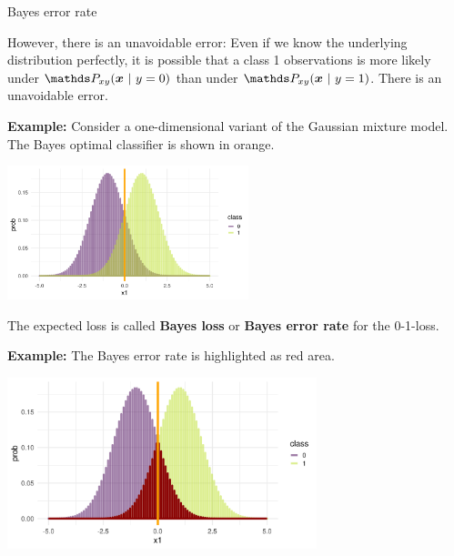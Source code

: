 \begin{vbframe}{Bayes error rate}

However, there is an unavoidable error: Even if we know the underlying distribution perfectly, it is possible that a class 1 observations is more likely under $\Pxy(\xv ~|~y = 0)$ than under $\Pxy(\xv ~|~y = 1)$. There is an unavoidable error. 

\lz 

\textbf{Example: } Consider a one-dimensional variant of the Gaussian mixture model. The Bayes optimal classifier is shown in orange. 

\begin{center}
\includegraphics[width = 7cm ]{figure_man/bayes_error_4.png} \\
\end{center}


\framebreak 

The expected loss is called \textbf{Bayes loss} or \textbf{Bayes error rate} for the 0-1-loss. 

\lz 

\textbf{Example: } The Bayes error rate is highlighted as red area. 

\begin{center}
\includegraphics[width = 9cm ]{figure_man/bayes_error_5.png} \\
\end{center}

\end{vbframe}

